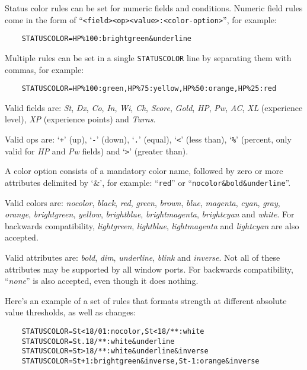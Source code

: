 Status color rules can be set for numeric fields and conditions.  Numeric
field rules come in the form of
``{\tt <field><op><value>:<color-option>\/}'', for example:

\begin{verbatim}
    STATUSCOLOR=HP%100:brightgreen&underline
\end{verbatim}

Multiple rules can be set in a single {\tt STATUSCOLOR\/} line by
separating them with commas, for example:

\begin{verbatim}
    STATUSCOLOR=HP%100:green,HP%75:yellow,HP%50:orange,HP%25:red
\end{verbatim}

Valid fields are: {\it St}, {\it Dx}, {\it Co}, {\it In}, {\it Wi}, {\it Ch},
{\it Score}, {\it Gold}, {\it HP}, {\it Pw}, {\it AC}, {\it XL} (experience
level), {\it XP} (experience points) and {\it Turns}.

Valid ops are: `{\tt +}' (up), `{\tt -}' (down), `{\tt .}' (equal),
`{\tt <}' (less than), `{\tt \%}' (percent, only valid for {\it HP} and
{\it Pw} fields) and `{\tt >}' (greater than).

A color option consists of a mandatory color name, followed by zero or more
attributes delimited by `\&', for example: ``{\tt red}'' or
``{\tt nocolor\&bold\&underline}''.

Valid colors are: {\it nocolor}, {\it black}, {\it red}, {\it green},
{\it brown}, {\it blue}, {\it magenta}, {\it cyan}, {\it gray},
{\it orange}, {\it brightgreen}, {\it yellow}, {\it brightblue},
{\it brightmagenta}, {\it brightcyan} and {\it white}.  For backwards
compatibility, {\it lightgreen}, {\it lightblue}, {\it lightmagenta} and
{\it lightcyan} are also accepted.

Valid attributes are: {\it bold}, {\it dim}, {\it underline}, {\it blink}
and {\it inverse}.  Not all of these attributes may be supported by all
window ports.  For backwards compatibility, ``{\it none}'' is also
accepted, even though it does nothing.

Here's an example of a set of rules that formats strength at different
absolute value thresholds, as well as changes:

\begin{verbatim}
    STATUSCOLOR=St<18/01:nocolor,St<18/**:white
    STATUSCOLOR=St.18/**:white&underline
    STATUSCOLOR=St>18/**:white&underline&inverse
    STATUSCOLOR=St+1:brightgreen&inverse,St-1:orange&inverse
\end{verbatim}

